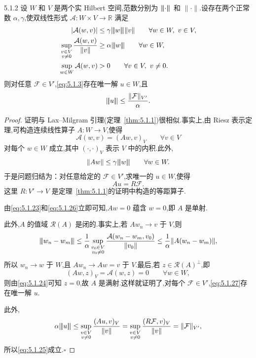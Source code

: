 \begin{theorem}[]{5.1.2}
设 \(W\) 和 \(V\) 是两个实 Hilbert 空间,范数分别为 \(\lVert\!\lvert \cdot\rvert\!\rVert\) 和 \(\|\cdot\|\).设存在两个正常数 \(\alpha,\gamma\),使双线性形式 \(\mathcal A\colon W\times V\to\mathbb R\) 满足
\begin{align}
  |\mathcal A(w,v)|&\le\gamma\tnorm{w}\|v\|\qquad\forall w\in W,\ v\in V,
    \label{eq:5.1.22}\\
  \sup_{\substack{v\in V\\v\ne0}}\frac{\mathcal A(w,v)}{\|v\|}
    &\ge\alpha\tnorm{w}\qquad\forall w\in W,
    \label{eq:5.1.23}\\
  \sup_{w\in W}\mathcal A(w,v)&>0\qquad\forall v\in V,\ v\ne0.
    \label{eq:5.1.24}
\end{align}
则对任意 \(\mathcal F\in V'\),\eqref{eq:5.1.3}存在唯一解 \(u\in W\),且
\begin{equation}\label{eq:5.1.25}
  \lVert\!\lvert u\rvert\!\rVert\le\frac{\|\mathcal F\|_{V'}}{\alpha}.
\end{equation}
\end{theorem}

\begin{proof}
证明与 Lax--Milgram 引理(定理~\ref{thm:5.1.1})很相似.事实上,由 Riesz 表示定理,可构造连续线性算子 \(A\colon W\to V\),使得
\begin{equation}\label{eq:5.1.26}
  \mathcal A(w,v)=(Aw,v)_V\qquad\forall v\in V
\end{equation}
对每个 \(w\in W\) 成立,其中 \((\cdot,\cdot)_V\) 表示 \(V\) 中的内积.此外,
\[
  \|Aw\|\le\gamma\lVert\!\lvert w\rvert\!\rVert\qquad\forall w\in W.
\]
于是问题归结为：对任意给定的 \(\mathcal F\in V'\),求唯一的 \(u\in W\),使得
\begin{equation}\label{eq:5.1.27}
  Au=R\mathcal F.
\end{equation}
这里 \(R\colon V'\to V\) 是定理~\ref{thm:5.1.1}的证明中构造的等距算子.

由\eqref{eq:5.1.23}和\eqref{eq:5.1.26}立即可知,\(Aw=0\) 蕴含 \(w=0\),即 \(A\) 是单射.

此外,\(A\) 的值域 \(\mathcal R(A)\) 是闭的.事实上,若 \(Aw_n\to v\) 于 \(V\),则
\[
  \lVert\!\lvert w_n-w_m\rvert\!\rVert\le\frac1\alpha
    \sup_{\substack{v_0\in V\\v_0\ne0}}
        \frac{\mathcal A(w_n-w_m,v_0)}{\|v_0\|}
    \le\frac1\alpha\|A(w_n-w_m)\|,
\]
所以 \(w_n\to w\) 于 \(W\),且 \(Aw_n\to Aw=v\) 于 \(V\).最后,若 \(z\in\mathcal R(A)^\perp\),即
\[
  (Aw,z)_V=\mathcal A(w,z)=0\qquad\forall w\in W,
\]
则由\eqref{eq:5.1.24}可知 \(z=0\),故 \(A\) 是满射.这样就证明了,对每个 \(\mathcal F\in V'\),\eqref{eq:5.1.27}存在唯一解 \(u\).

此外,
\[
  \alpha\lVert\!\lvert u\rvert\!\rVert\le\sup_{\substack{v\in V\\v\ne0}}\frac{(Au,v)_V}{\|v\|}
    =\sup_{\substack{v\in V\\v\ne0}}\frac{(R\mathcal F,v)_V}{\|v\|}
    =\|\mathcal F\|_{V'},
\]
所以\eqref{eq:5.1.25}成立.\hfill\(\square\)
\end{proof}

